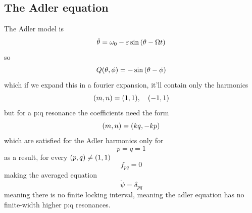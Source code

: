 \subsection{The Adler equation}
The Adler model is 
\begin{equation}
    \dot{\theta}=\omega_0-\varepsilon\sin\left(\theta-\Omega t\right)
\end{equation}
so
\begin{equation}
    Q(\theta,\phi) = -\sin\left(\theta-\phi\right)
\end{equation}
which if we expand this in a fourier expansion, it'll contain only the harmonics
\begin{equation}
    \left(m,n\right)=(1,1),\quad(-1,1)
\end{equation}
but for a p:q resonance the coefficients need the form 
\begin{equation}
    \left(m,n\right)=\left(kq,-kp\right)
\end{equation}
which are satisfied for the Adler harmonics only for 
\begin{equation}
    p=q=1
\end{equation}
as a result, for every \(\left(p,q\right)\neq(1,1)\)
\begin{equation}
    f_{pq}=0
\end{equation}
making the averaged equation 
\begin{equation}
    \dot{\psi}=\delta_{pq}
\end{equation}
meaning there is no finite locking interval, meaning the adler equation has no finite-width higher p:q resonances.